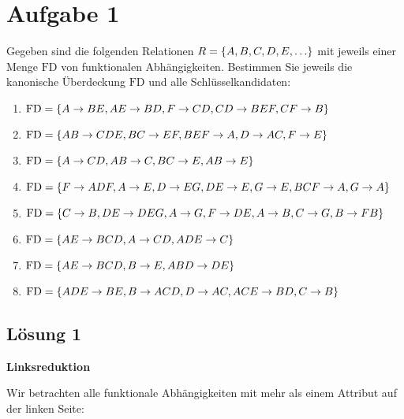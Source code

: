 \documentclass[main.tex]{subfiles}
\begin{document}
\section{Aufgabe 1}
Gegeben sind die folgenden Relationen $R=\set{A,B,C,D,E,\dots}$ mit jeweils einer Menge $\text{FD}$ von funktionalen Abhängigkeiten. 
Bestimmen Sie jeweils die kanonische Überdeckung $\text{FD}$ und alle Schlüsselkandidaten:
\begin{enumerate}
\item $\text{FD}=\{A\to BE, AE\to BD, F\to CD, CD\to BEF, CF\to B\}$
\item $\text{FD}=\{AB\to CDE, BC\to EF, BEF\to A, D\to AC, F\to E\}$
\item $\text{FD}=\{A\to CD, AB\to C, BC\to E, AB\to E\}$
\item $\text{FD}=\{F\to ADF, A\to E, D\to EG, DE\to E, G\to E, BCF\to A, G\to A\}$
\item $\text{FD}=\{C\to B, DE\to DEG, A\to G, F\to DE, A\to B, C\to G, B\to FB\}$
\item $\text{FD}=\{AE\to BCD, A\to CD, ADE\to C\}$
\item $\text{FD}=\{AE\to BCD, B\to E, ABD\to DE\}$
\item $\text{FD}=\{ADE\to BE, B\to ACD, D\to AC, ACE\to BD, C\to B\}$
\end{enumerate}

\subsection{Lösung 1}
\textbf{Linksreduktion}

Wir betrachten alle funktionale Abhängigkeiten mit mehr als einem Attribut auf der linken Seite: \\
\end{document}
